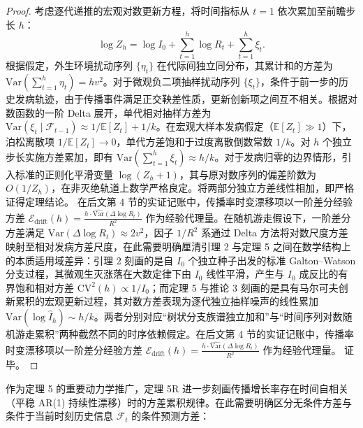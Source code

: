 \documentclass[11pt,a4paper]{article}
\theoremstyle{plain}
\theoremstyle{definition}
\begin{document}
\begin{proof}
考虑逐代递推的宏观对数更新方程，将时间指标从 $t=1$ 依次累加至前瞻步长 $h$：
\begin{equation}
\log Z_h = \log I_0 + \sum_{t=1}^h \log R_t + \sum_{t=1}^h \xi_t.
\end{equation}
根据假定，外生环境扰动序列 $\{\eta_t\}$ 在代际间独立同分布，其累计和的方差为 $\text{Var}(\sum_{t=1}^h \eta_t) = h v^2$。对于微观负二项抽样扰动序列 $\{\xi_t\}$，条件于前一步的历史发病轨迹，由于传播事件满足正交鞅差性质，更新创新项之间互不相关。根据对数函数的一阶 Delta 展开，单代相对抽样方差为 $\text{Var}(\xi_t \mid \mathcal{F}_{t-1}) \approx 1/\mathbb{E}[Z_t] + 1/k$。在宏观大样本发病假定（$\mathbb{E}[Z_t] \gg 1$）下，泊松离散项 $1/\mathbb{E}[Z_t] \to 0$，单代方差饱和于过度离散倒数常数 $1/k$。对 $h$ 个独立步长实施方差累加，即有 $\text{Var}(\sum_{t=1}^h \xi_t) \approx h/k$。对于发病归零的边界情形，引入标准的正则化平滑变量 $\log(Z_h + 1)$，其与原对数序列的偏差阶数为 $O(1/Z_h)$，在非灭绝轨道上数学严格良定。将两部分独立方差线性相加，即严格证得定理结论。 在后文第 4 节的实证记账中，传播率时变漂移项以一阶差分经验方差 $\mathcal{E}_{\text{drift}}(h) = \frac{h \cdot \widehat{\text{Var}}(\Delta \log R_t)}{R^2}$ 作为经验代理量。在随机游走假设下，一阶差分方差满足 $\text{Var}(\Delta \log R_t) \approx 2 v^2$，因子 $1/R^2$ 系通过 Delta 方法将对数尺度方差映射至相对发病方差尺度，在此需要明确厘清引理 2 与定理 5 之间在数学结构上的本质适用域差异：引理 2 刻画的是自 $I_0$ 个独立种子出发的标准 Galton--Watson 分支过程，其微观生灭涨落在大数定律下由 $I_0$ 线性平滑，产生与 $I_0$ 成反比的有界饱和相对方差 $\text{CV}^2(h) \propto 1/I_0$；而定理 5 与推论 3 刻画的是具有马尔可夫创新累积的宏观更新过程，其对数方差表现为逐代独立抽样噪声的线性累加 $\text{Var}(\log \hat{I}_h) \sim h/k$。两者分别对应“树状分支族谱独立加和”与“时间序列对数随机游走累积”两种截然不同的时序依赖假定。在后文第 4 节的实证记账中，传播率时变漂移项以一阶差分经验方差 $\mathcal{E}_{\text{drift}}(h) = \frac{h \cdot \widehat{\text{Var}}(\Delta \log R_t)}{R^2}$ 作为经验代理量。
证毕。
\end{proof}

作为定理 5 的重要动力学推广，定理 5R 进一步刻画传播增长率存在时间自相关（平稳 AR(1) 持续性漂移）时的方差累积规律。在此需要明确区分无条件方差与条件于当前时刻历史信息 $\mathcal{F}_t$ 的条件预测方差：
\end{document}
